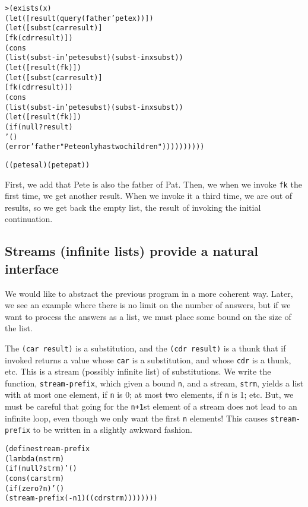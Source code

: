 \begin{alltt}
> (exists (x)
    (let ([result (query (father 'pete x))])
      (let ([subst (car result)]
            [fk (cdr result)])
      (cons
        (list (subst-in 'pete subst) (subst-in x subst))
        (let ([result (fk)])
          (let ([subst (car result)]
                [fk (cdr result)])
            (cons
              (list (subst-in 'pete subst) (subst-in x subst))
              (let ([result (fk)])
                (if (null? result)
                  '()
                  (error 'father "Pete only has two children"))))))))))

((pete sal) (pete pat))
\end{alltt}
\noindent
First, we add that Pete is also the father of Pat.  Then, we when we
invoke \texttt{fk} the first time, we get another result.  When we
invoke it a third time, we are out of results, so we get back the
empty list, the result of invoking the initial continuation.

\subsection{Streams (infinite lists) provide a natural interface}

We would like to abstract the previous program in a more coherent way.
Later, we see an example where there is no limit on the number of
answers, but if we want to process the answers as a list, we must
place some bound on the size of the list.

The \texttt{(car result)} is a substitution, and the \texttt{(cdr
result)} is a thunk that if invoked returns a value whose \texttt{car}
is a substitution, and whose \texttt{cdr} is a thunk, etc.  This is a
stream (possibly infinite list) of substitutions.  We write the
function, \texttt{stream-prefix}, which given a bound \texttt{n}, and
a stream, \texttt{strm}, yields a list with at most one element, if
\texttt{n} is 0; at most two elements, if \texttt{n} is 1; etc.  But,
we must be careful that going for the \texttt{n+1}st element of a
stream does not lead to an infinite loop, even though we only want the
first \texttt{n} elements! This causes \texttt{stream-prefix} to be
written in a slightly awkward fashion.

\begin{alltt}
(define stream-prefix
  (lambda (n strm)
    (if (null? strm) '()
      (cons (car strm)
        (if (zero? n) '()
          (stream-prefix (- n 1) ((cdr strm))))))))
\end{alltt}

